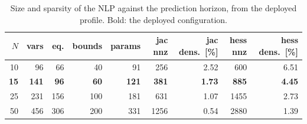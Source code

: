 \begin{table}[htbp]
  \centering
  \small
  \caption{Size and sparsity of the NLP against the prediction horizon, from the deployed profile. Bold: the deployed configuration.}
  \label{res:tab:nlp}
  \begin{tabular}{rrrrrrrrr}
    \toprule
    $N$ & vars & eq. & bounds & params & jac nnz & jac dens.\ [\%] & hess nnz & hess dens.\ [\%] \\
    \midrule
    10 & 96 & 66 & 40 & 91 & 256 & 2.52 & 600 & 6.51 \\
    \textbf{15} & \textbf{141} & \textbf{96} & \textbf{60} & \textbf{121} & \textbf{381} & \textbf{1.73} & \textbf{885} & \textbf{4.45} \\
    25 & 231 & 156 & 100 & 181 & 631 & 1.07 & 1455 & 2.73 \\
    50 & 456 & 306 & 200 & 331 & 1256 & 0.54 & 2880 & 1.39 \\
    \bottomrule
  \end{tabular}
\end{table}

